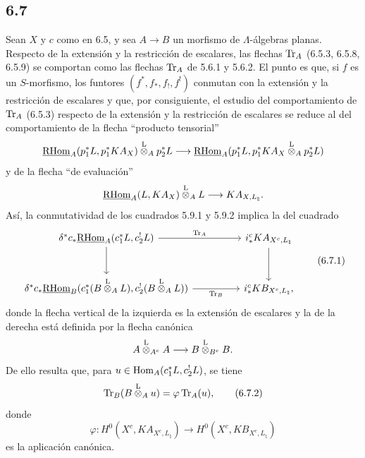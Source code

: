 \subsection*{6.7}
Sean $X$ y $c$ como en 6.5, y sea $A\to B$ un morfismo de $\Lambda$-álgebras planas. Respecto de la extensión y la restricción de escalares, las flechas $\operatorname{Tr}_A$ (6.5.3, 6.5.8, 6.5.9) se comportan como las flechas $\operatorname{Tr}_A$ de 5.6.1 y 5.6.2. El punto es que, si $f$ es un $S$-morfismo, los funtores $(f^*,f_*,f_!,f^!)$ conmutan con la extensión y la restricción de escalares y que, por consiguiente, el estudio del comportamiento de $\operatorname{Tr}_A$ (6.5.3) respecto de la extensión y la restricción de escalares se reduce al del comportamiento de la flecha ``producto tensorial''
\[
\underline{\mathrm{RHom}}_A(p_1^*L,p_1^*KA_X)\overset{\mathrm L}{\otimes}_Ap_2^*L
\longrightarrow
\underline{\mathrm{RHom}}_A(p_1^*L,p_1^*KA_X\overset{\mathrm L}{\otimes}_Ap_2^*L)
\]
y de la flecha ``de evaluación''
\[
\underline{\mathrm{RHom}}_A(L,KA_X)\overset{\mathrm L}{\otimes}_A L\longrightarrow KA_{X,L_{\natural}}.
\]
Así, la conmutatividad de los cuadrados 5.9.1 y 5.9.2 implica la del cuadrado
\begin{equation}
\begin{tikzcd}[column sep=huge,row sep=large]
\delta^*c_*\uRHom_A(c_1^*L,c_2^!L) \arrow[r,"\Tr_A"] \arrow[d]
& i_*^cKA_{X^c,L_{\natural}} \arrow[d]\\
\delta^*c_*\uRHom_B(c_1^*(B\lten_A L),c_2^!(B\lten_A L)) \arrow[r,"\Tr_B"']
& i_*^cKB_{X^c,L_{\natural}},
\end{tikzcd}
\tag{6.7.1}
\end{equation}
donde la flecha vertical de la izquierda es la extensión de escalares y la de la derecha está definida por la flecha canónica
\[
A\overset{\mathrm L}{\otimes}_{A^e}A\longrightarrow B\overset{\mathrm L}{\otimes}_{B^e}B.
\]
De ello resulta que, para $u\in\operatorname{Hom}_A(c_1^*L,c_2^!L)$, se tiene
\begin{equation}
\operatorname{Tr}_B(B\overset{\mathrm L}{\otimes}_Au)=\varphi\operatorname{Tr}_A(u),
\tag{6.7.2}
\end{equation}
donde
\[
\varphi:H^0(X^c,KA_{X^c,L_{\natural}})\longrightarrow H^0(X^c,KB_{X^c,L_{\natural}})
\]
es la aplicación canónica.


